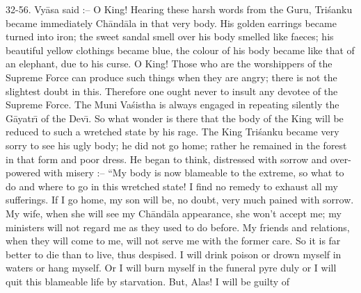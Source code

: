 32-56. Vy\=asa said :-- O King! Hearing these harsh words from the Guru, Tri\'sanku became immediately Ch\=and\=ala in that very body. His golden earrings became turned into iron; the sweet sandal smell over his body smelled like faeces; his beautiful yellow clothings became blue, the colour of his body became like that of an elephant, due to his curse. O King! Those who are the worshippers of the Supreme Force can produce such things when they are angry; there is not the slightest doubt in this. Therefore one ought never to insult any devotee of the Supreme Force. The Muni Va\'sistha is always engaged in repeating silently the G\=ayatr\={\i} of the Dev\={\i}. So what wonder is there that the body of the King will be reduced to such a wretched state by his rage. The King Tri\'sanku became very sorry to see his ugly body; he did not go home; rather he remained in the forest in that form and poor dress. He began to think, distressed with sorrow and over-powered with misery :-- ``My body is now blameable to the extreme, so what to do and where to go in this wretched state! I find no remedy to exhaust all my sufferings. If I go home, my son will be, no doubt, very much pained with sorrow. My wife, when she will see my Ch\=and\=ala appearance, she won't accept me; my ministers will not regard me as they used to do before. My friends and relations, when they will come to me, will not serve me with the former care. So it is far better to die than to live, thus despised. I will drink poison or drown myself in waters or hang myself. Or I will burn myself in the funeral pyre duly or I will quit this blameable life by starvation. But, Alas! I will be guilty of

